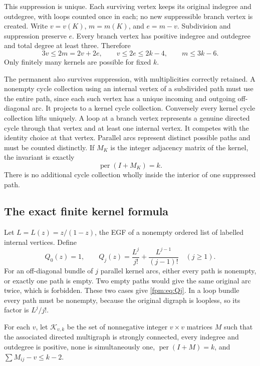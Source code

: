 \documentclass[11pt]{article}
\theoremstyle{definition}\newtheorem{definition}[theorem]{Definition}
\theoremstyle{remark}\newtheorem{remark}[theorem]{Remark}
\newcommand{\Per}{\operatorname{per}}
\begin{document}
This suppression is unique. Each surviving vertex keeps its original indegree and outdegree, with loops counted once in each; no new suppressible branch vertex is created. Write $v=v(K)$, $m=m(K)$, and $e=m-v$. Subdivision and suppression preserve $e$. Every branch vertex has positive indegree and outdegree and total degree at least three. Therefore
\begin{equation}\label{fpm:eq:kernelbound}
 3v\le2m=2v+2e,\qquad
 v\le2e\le2k-4,\qquad m\le3k-6.
\end{equation}
Only finitely many kernels are possible for fixed $k$.

The permanent also survives suppression, with multiplicities correctly retained. A nonempty cycle collection using an internal vertex of a subdivided path must use the entire path, since each such vertex has a unique incoming and outgoing off-diagonal arc. It projects to a kernel cycle collection. Conversely every kernel cycle collection lifts uniquely. A loop at a branch vertex represents a genuine directed cycle through that vertex and at least one internal vertex. It competes with the identity choice at that vertex. Parallel arcs represent distinct possible paths and must be counted distinctly. If $M_K$ is the integer adjacency matrix of the kernel, the invariant is exactly
\begin{equation}\label{fpm:eq:kernelper}
 \Per(I+M_K)=k.
\end{equation}
There is no additional cycle collection wholly inside the interior of one suppressed path.

\subsection{The exact finite kernel formula}
Let $L=L(z)=z/(1-z)$, the EGF of a nonempty ordered list of labelled internal vertices. Define
\begin{equation}\label{fpm:eq:Qj}
 Q_0(z)=1,\qquad
 Q_j(z)=\frac{L^j}{j!}+\frac{L^{j-1}}{(j-1)!}\quad(j\ge1).
\end{equation}
For an off-diagonal bundle of $j$ parallel kernel arcs, either every path is nonempty, or exactly one path is empty. Two empty paths would give the same original arc twice, which is forbidden. These two cases give \eqref{fpm:eq:Qj}. In a loop bundle every path must be nonempty, because the original digraph is loopless, so its factor is $L^j/j!$.

For each $v$, let $\mathcal K_{v,k}$ be the set of nonnegative integer $v\times v$ matrices $M$ such that the associated directed multigraph is strongly connected, every indegree and outdegree is positive, none is simultaneously one, $\Per(I+M)=k$, and $\sum M_{ij}-v\le k-2$.
\end{document}
